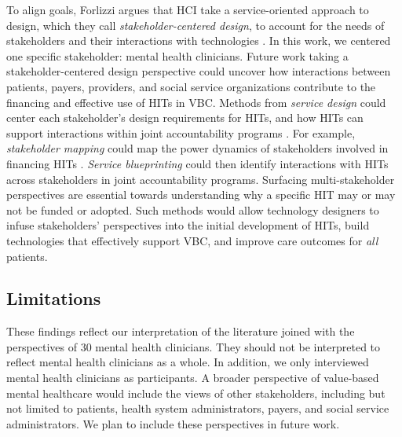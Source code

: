 To align goals, Forlizzi argues that HCI take a service-oriented approach to design, which they call \textit{stakeholder-centered design}, to account for the needs of stakeholders and their interactions with technologies \cite{forlizzi_moving_2018}. 
In this work, we centered one specific stakeholder: mental health clinicians.
Future work taking a stakeholder-centered design perspective could uncover how interactions between patients, payers, providers, and social service organizations contribute to the financing and effective use of HITs in VBC. 
Methods from \textit{service design} could center each stakeholder's design requirements for HITs, and how HITs can support interactions within joint accountability programs \cite{hwang_societal-scale_2024, forlizzi_promoting_2013}.
For example, \textit{stakeholder mapping} could map the power dynamics of stakeholders involved in financing HITs \cite{newcombe_client_2003}.
\textit{Service blueprinting} could then identify interactions with HITs across stakeholders in joint accountability programs.
Surfacing multi-stakeholder perspectives are essential towards understanding why a specific HIT may or may not be funded or adopted.
Such methods would allow technology designers to infuse stakeholders' perspectives into the initial development of HITs, build technologies that effectively support VBC, and improve care outcomes for \textit{all} patients.

\subsection{Limitations}

These findings reflect our interpretation of the literature joined with the perspectives of 30 mental health clinicians.
They should not be interpreted to reflect mental health clinicians as a whole.
In addition, we only interviewed mental health clinicians as participants.
A broader perspective of value-based mental healthcare would include the views of other stakeholders, including but not limited to patients, health system administrators, payers, and social service administrators.
We plan to include these perspectives in future work.

